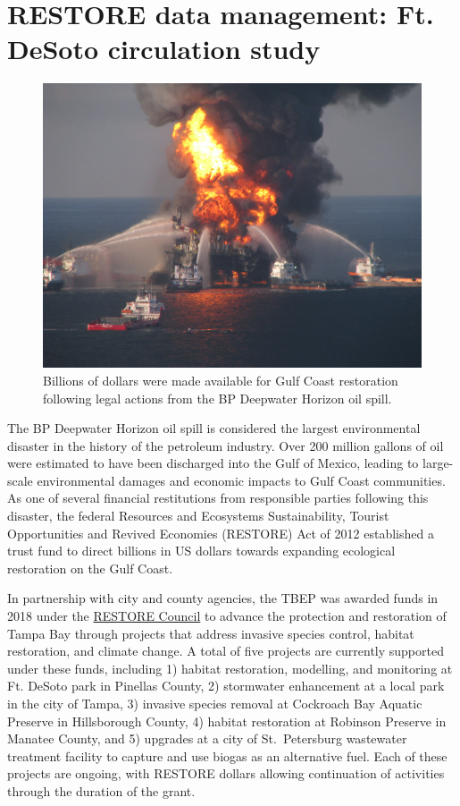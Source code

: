 \documentclass[
]{book}
\begin{document}
\section{RESTORE data management: Ft. DeSoto circulation study}\label{desoto}

\begin{figure}

{\centering \includegraphics[width=0.7\linewidth]{img/deepwater} 

}

\caption{Billions of dollars were made available for Gulf Coast restoration following legal actions from the BP Deepwater Horizon oil spill.}\label{fig:unnamed-chunk-13}
\end{figure}

The BP Deepwater Horizon oil spill is considered the largest environmental disaster in the history of the petroleum industry. Over 200 million gallons of oil were estimated to have been discharged into the Gulf of Mexico, leading to large-scale environmental damages and economic impacts to Gulf Coast communities. As one of several financial restitutions from responsible parties following this disaster, the federal Resources and Ecosystems Sustainability, Tourist Opportunities and Revived Economies (RESTORE) Act of 2012 established a trust fund to direct billions in US dollars towards expanding ecological restoration on the Gulf Coast.

In partnership with city and county agencies, the TBEP was awarded funds in 2018 under the \href{https://www.restorethegulf.gov/}{RESTORE Council} to advance the protection and restoration of Tampa Bay through projects that address invasive species control, habitat restoration, and climate change. A total of five projects are currently supported under these funds, including 1) habitat restoration, modelling, and monitoring at Ft. DeSoto park in Pinellas County, 2) stormwater enhancement at a local park in the city of Tampa, 3) invasive species removal at Cockroach Bay Aquatic Preserve in Hillsborough County, 4) habitat restoration at Robinson Preserve in Manatee County, and 5) upgrades at a city of St.~Petersburg wastewater treatment facility to capture and use biogas as an alternative fuel. Each of these projects are ongoing, with RESTORE dollars allowing continuation of activities through the duration of the grant.
\end{document}
